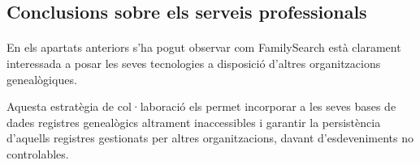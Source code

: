     \subsection{Conclusions sobre els serveis professionals}

    \paragraph{}
    En els apartats anteriors s'ha pogut observar com FamilySearch està clarament interessada a posar les seves tecnologies a disposició d'altres organitzacions genea\-lò\-gi\-ques.

    Aquesta estratègia de col·laboració els permet incorporar a les seves bases de dades registres genealògics altrament inaccessibles i garantir la persistència d'aquells registres gestionats per altres organitzacions, davant d'esdeveniments no controlables.
